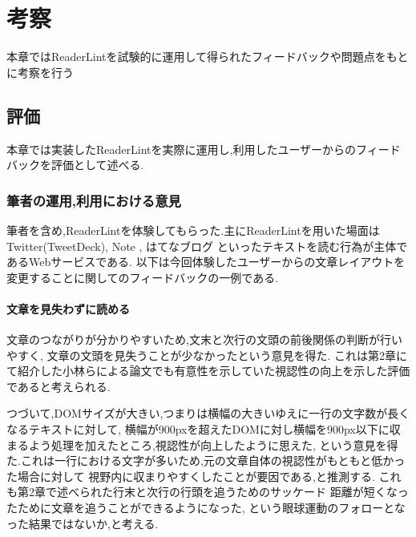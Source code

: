 \chapter{考察}
本章ではReaderLintを試験的に運用して得られたフィードバックや問題点をもとに考察を行う

\newpage

\section{評価}

本章では実装したReaderLintを実際に運用し,利用したユーザーからのフィードバックを評価として述べる.

\subsection{筆者の運用,利用における意見}
筆者を含め,ReaderLintを体験してもらった.主にReaderLintを用いた場面は
Twitter(TweetDeck)\footnotemark[1]\label{twitter},
Note \footnotemark[2]\label{note},
はてなブログ \footnotemark[3]\label{hatenablog} 
といったテキストを読む行為が主体であるWebサービスである.
以下は今回体験したユーザーからの文章レイアウトを変更することに関してのフィードバックの一例である.

\subsubsection{文章を見失わずに読める}
文章のつながりが分かりやすいため,文末と次行の文頭の前後関係の判断が行いやすく,
文章の文頭を見失うことが少なかったという意見を得た.
これは第2章にて紹介した小林らによる論文でも有意性を示していた視認性の向上を示した評価であると考えられる.

つづいて,DOMサイズが大きい,つまりは横幅の大きいゆえに一行の文字数が長くなるテキストに対して,
横幅が900pxを超えたDOMに対し横幅を900px以下に収まるよう処理を加えたところ,視認性が向上したように思えた,
という意見を得た.これは一行における文字が多いため,元の文章自体の視認性がもともと低かった場合に対して
視野内に収まりやすくしたことが要因である,と推測する.
これも第2章で述べられた行末と次行の行頭を追うためのサッケード
距離が短くなったために文章を追うことができるようになった,
という眼球運動のフォローとなった結果ではないか,と考える.

